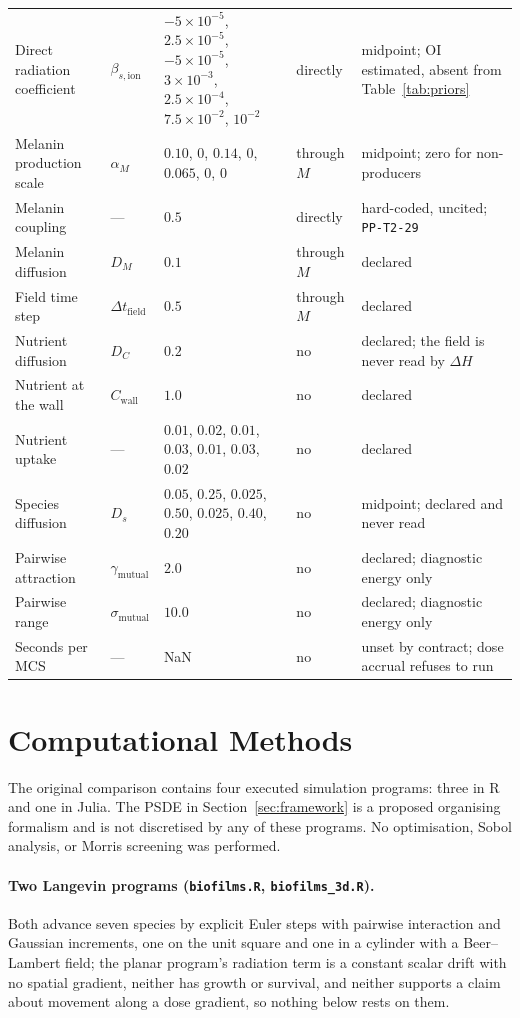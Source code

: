 \documentclass[11pt]{article}
\begin{document}
\begin{table}[h!]
{\begin{tabular}{@{}llp{5.0cm}lp{4.6cm}@{}}
Direct radiation coefficient & $\beta_{s,\mathrm{ion}}$ & $-5\times10^{-5}$, $2.5\times10^{-5}$, $-5\times10^{-5}$, $3\times10^{-3}$, $2.5\times10^{-4}$, $7.5\times10^{-2}$, $10^{-2}$ & directly & midpoint; OI estimated, absent from Table~\ref{tab:priors} \\
Melanin production scale & $\alpha_M$ & $0.10$, $0$, $0.14$, $0$, $0.065$, $0$, $0$ & through $M$ & midpoint; zero for non-producers \\
Melanin coupling & --- & $0.5$ & directly & hard-coded, uncited; \texttt{PP-T2-29} \\
Melanin diffusion & $D_M$ & $0.1$ & through $M$ & declared \\
Field time step & $\Delta t_{\mathrm{field}}$ & $0.5$ & through $M$ & declared \\
Nutrient diffusion & $D_C$ & $0.2$ & no & declared; the field is never read by $\Delta H$ \\
Nutrient at the wall & $C_{\mathrm{wall}}$ & $1.0$ & no & declared \\
Nutrient uptake & --- & $0.01$, $0.02$, $0.01$, $0.03$, $0.01$, $0.03$, $0.02$ & no & declared \\
Species diffusion & $D_s$ & $0.05$, $0.25$, $0.025$, $0.50$, $0.025$, $0.40$, $0.20$ & no & midpoint; declared and never read \\
Pairwise attraction & $\gamma_{\mathrm{mutual}}$ & $2.0$ & no & declared; diagnostic energy only \\
Pairwise range & $\sigma_{\mathrm{mutual}}$ & $10.0$ & no & declared; diagnostic energy only \\
Seconds per MCS & --- & NaN & no & unset by contract; dose accrual refuses to run \\
\bottomrule
\end{tabular}}
\end{table}

\section{Computational Methods}
\label{sec:methods}

The original comparison contains four executed simulation programs: three in R and one in Julia. The PSDE
in Section~\ref{sec:framework} is a proposed organising formalism and is not discretised by any of these programs.
No optimisation, Sobol analysis, or Morris screening was performed.

\paragraph{Two Langevin programs (\texttt{biofilms.R}, \texttt{biofilms\_3d.R}).}
Both advance seven species by explicit Euler steps with pairwise interaction and Gaussian
increments, one on the unit square and one in a cylinder with a Beer--Lambert field; the planar
program's radiation term is a constant scalar drift with no spatial gradient, neither has growth
or survival, and neither supports a claim about movement along a dose gradient, so nothing below
rests on them.
\end{document}
